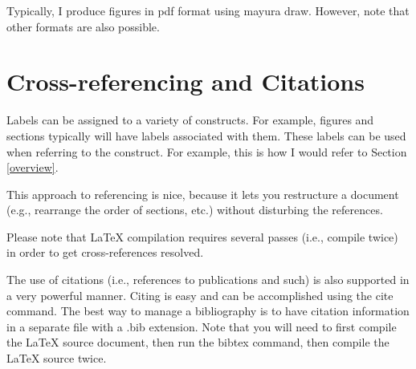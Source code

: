 \documentclass{article}
\begin{document}
Typically, I produce figures in pdf format using mayura draw.
However, note that other formats are also possible.

\section{Cross-referencing and Citations}

Labels can be assigned to a variety of constructs. For example,
figures and sections typically will have labels associated with
them. These labels can be used when referring to the construct.
For example, this is how I would refer to Section \ref{overview}.

This approach to referencing is nice, because it lets you
restructure a document (e.g., rearrange the order of sections,
etc.) without disturbing the references.

Please note that LaTeX compilation requires several passes (i.e.,
compile twice) in order to get cross-references resolved.

The use of citations (i.e., references to publications and such)
is also supported in a very powerful manner. Citing is easy
\cite{kniesel:conditional-transformations} and can be accomplished
using the cite command. The best way to manage a bibliography is
to have citation information in a separate file with a .bib
extension. Note that you will need to first compile the LaTeX
source document, then run the bibtex command, then compile the
LaTeX source twice.



\nocite{*} %

%




\end{document}
